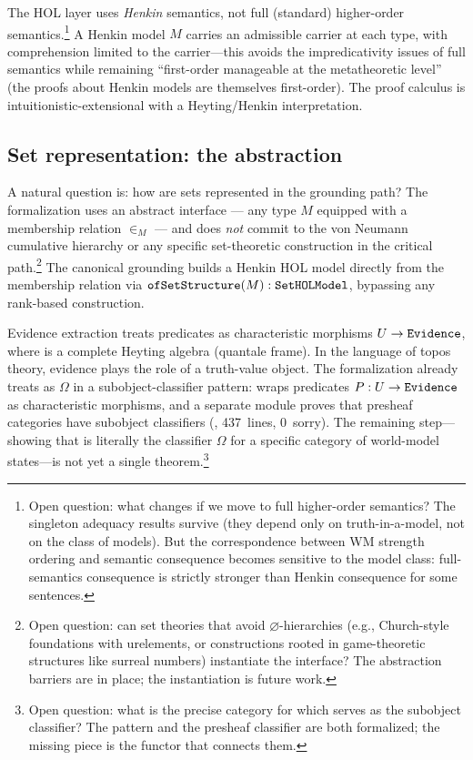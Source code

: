 \documentclass[11pt,openany]{report}
\begin{document}
The HOL layer uses \emph{Henkin} semantics, not full (standard)
higher-order semantics.\footnote{Open question: what changes if we
move to full higher-order semantics?  The singleton adequacy results
survive (they depend only on truth-in-a-model, not on the class of
models).  But the correspondence between WM strength ordering and
semantic consequence becomes sensitive to the model class:
full-semantics consequence is strictly stronger than Henkin
consequence for some sentences.}  A Henkin model $M$ carries an
admissible carrier at each type, with comprehension limited to the
carrier---this avoids the impredicativity issues of full semantics
while remaining ``first-order manageable at the metatheoretic level''
(the proofs about Henkin models are themselves first-order).  The
proof calculus is intuitionistic-extensional with a Heyting/Henkin
interpretation.

\subsection{Set representation: the  abstraction}

A natural question is: how are sets represented in the grounding
path?  The formalization uses an abstract  interface
--- any type $M$ equipped with a membership relation $\in_M$ ---
and does \emph{not} commit to the von Neumann cumulative hierarchy
or any specific set-theoretic construction in the critical
path.\footnote{Open question: can set theories that avoid
$\varnothing$-hierarchies (e.g., Church-style foundations with
urelements, or constructions rooted in game-theoretic structures
like surreal numbers) instantiate the  interface?
The abstraction barriers are in place; the instantiation is future
work.}  The canonical grounding builds a Henkin HOL model directly
from the membership relation via
$\texttt{ofSetStructure}(M) : \texttt{SetHOLModel}$,
bypassing any rank-based construction.

Evidence extraction treats predicates as characteristic morphisms
$U \to \mathtt{Evidence}$, where \Evidence{} is a complete Heyting algebra
(quantale frame).  In the language of topos theory, evidence plays
the role of a truth-value
object.  The formalization already treats \Evidence{} as
$\Omega$ in a subobject-classifier pattern: 
wraps predicates $P : U \to \mathtt{Evidence}$ as characteristic morphisms,
and a separate module proves that presheaf categories have subobject
classifiers (, 437~lines,
0~sorry).  The remaining step---showing that \Evidence{} is literally
the classifier $\Omega$ for a specific category of world-model
states---is not yet a single
theorem.\footnote{Open question: what is the precise category for
which \Evidence{} serves as the subobject classifier?  The
 pattern and the presheaf classifier are
both formalized; the missing piece is the functor that connects
them.}
\end{document}
